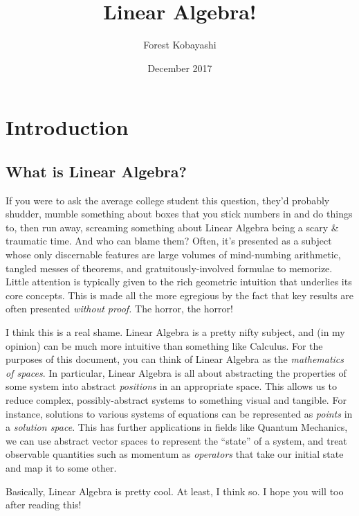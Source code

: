 \documentclass[cm, 10pt, titlepage, oneside]{book}
\title{\bf Linear Algebra!}
\date{December 2017}
\author{Forest Kobayashi}
\begin{document}

\frontmatter
\maketitle
\tableofcontents
\mainmatter

\chapter{Introduction}
  \section{What is Linear Algebra?}
    If you were to ask the average college student this question,
    they'd probably shudder, mumble something about boxes that you
    stick numbers in and do things to, then run away, screaming
    something about Linear Algebra being a scary \& traumatic time.
    And who can blame them? Often, it's presented as a subject whose
    only discernable features are large volumes of mind-numbing
    arithmetic, tangled messes of theorems, and gratuitously-involved
    formulae to memorize. Little attention is typically given to the
    rich geometric intuition that underlies its core concepts. This is
    made all the more egregious by the fact that key results are often
    presented \emph{without proof.} The horror, the horror!

    I think this is a real shame. Linear Algebra is a pretty nifty
    subject, and (in my opinion) can be much more intuitive than
    something like Calculus. For the purposes of this document, you
    can think of Linear Algebra as the \emph{mathematics of spaces}.
    In particular, Linear Algebra is all about abstracting the
    properties of some system into abstract \emph{positions} in an
    appropriate space. This allows us to reduce complex,
    possibly-abstract systems to something visual and tangible. For
    instance, solutions to various systems of equations can be
    represented as \emph{points} in a \emph{solution space}. This has
    further applications in fields like Quantum Mechanics, we can use
    abstract vector spaces to represent the ``state'' of a system, and
    treat observable quantities such as momentum as \emph{operators}
    that take our initial state and map it to some other.

    Basically, Linear Algebra is pretty cool. At least, I think so.
    I hope you will too after reading this!
\end{document}
